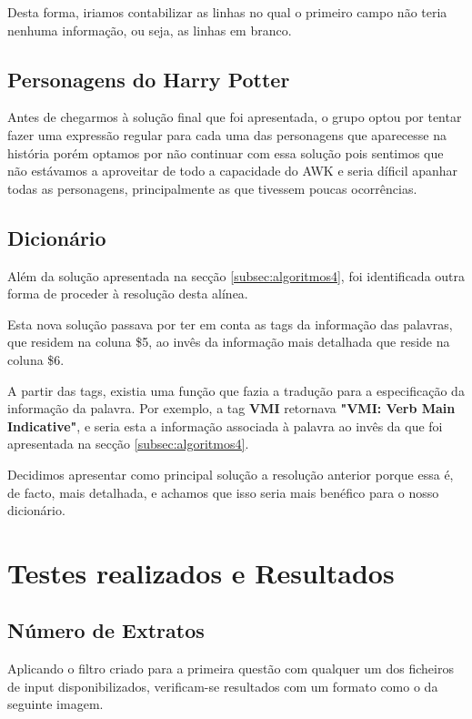 \documentclass[11pt,a4paper]{report}
\begin{document}
Desta forma, iriamos contabilizar as linhas no qual o primeiro campo não teria nenhuma informação, ou seja, as linhas em branco.

\subsection{Personagens do Harry Potter}

Antes de chegarmos à solução final que foi apresentada, o grupo optou por tentar fazer uma expressão regular para cada uma das personagens que aparecesse na história porém optamos por não continuar com essa solução pois sentimos que não estávamos a aproveitar de todo a capacidade do AWK e seria díficil apanhar todas as personagens, principalmente as que tivessem poucas ocorrências.


\subsection{Dicionário}

Além da solução apresentada na secção \ref{subsec:algoritmos4}, foi identificada outra forma de proceder à resolução desta alínea.

Esta nova solução passava por ter em conta as tags da informação das palavras, que residem na coluna \$5, ao invês da informação mais detalhada que reside na coluna \$6.

A partir das tags, existia uma função que fazia a tradução para a especificação da informação da palavra. Por exemplo, a tag \textbf{VMI} retornava \textbf{"VMI: Verb Main Indicative"}, e seria esta a informação associada à palavra ao invês da que foi apresentada na secção \ref{subsec:algoritmos4}.

Decidimos apresentar como principal solução a resolução anterior porque essa é, de facto, mais detalhada, e achamos que isso seria mais benéfico para o nosso dicionário.


\section{Testes realizados e Resultados}
\subsection{Número de Extratos}

Aplicando o filtro criado para a primeira questão com qualquer um dos ficheiros de input disponibilizados, verificam-se resultados com um formato como o da seguinte imagem.
\end{document}
